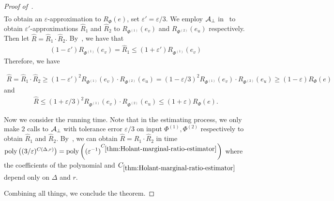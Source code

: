 \documentclass[11pt]{article}
\def\poly{\mathrm{poly}}
\newcommand{\wh}[1]{\widehat{#1}}
\renewcommand{\Pr}[2][]{ \ifthenelse{\isempty{#1}}
  {\mathbf{Pr}\left[#2\right]} {\mathbf{Pr}_{#1}\left[#2\right]} }
\begin{document}
\begin{proof}[Proof of~]
\begin{align*}
    \end{align*}
    To obtain an $\varepsilon$-approximation to $R_\Phi(e)$, set $\varepsilon' = \varepsilon/3$. We employ $\mathcal{A}_\bot$ in~ to obtain $\varepsilon'$-approximations $\wh{R}_1$ and $\wh{R}_2$ to $R_{\Phi^{(1)}}(e_v)$ and $R_{\Phi^{(2)}}(e_u)$ respectively. Then let $\wh{R} = \wh{R}_1 \cdot \wh{R}_2$. By~, we have that
    \begin{align*}
        (1 - \varepsilon')R_{\Phi^{(1)}}(e_v) = \wh{R}_1 \leq (1 + \varepsilon')R_{\Phi^{(1)}}(e_v)
    \end{align*}
    Therefore, we have

    
    \begin{align*}
        \wh{R} = \wh{R}_1 \cdot \wh{R}_2\ge (1 - \varepsilon')^2R_{\Phi^{(1)}}(e_v) \cdot R_{\Phi^{(2)}}(e_u) =
        (1 - \varepsilon/3)^2 R_{\Phi^{(1)}}(e_v) \cdot R_{\Phi^{(2)}}(e_u) \ge (1 - \varepsilon) R_{\Phi}(e)
    \end{align*}
    and
    \begin{align*}
        \wh{R} \le (1 + \varepsilon/3)^2 R_{\Phi^{(1)}}(e_v) \cdot R_{\Phi^{(2)}}(e_u) \le (1 + \varepsilon) R_{\Phi}(e).
    \end{align*}

    Now we consider the running time. Note that in the estimating process, we only make $2$ calls to $\mathcal{A}_\bot$ with tolerance error $\varepsilon/3$ on input $\Phi^{(1)}, \Phi^{(2)}$ respectively to obtain $\wh{R}_1$ and $\wh{R}_2$. By~, we can obtain $\wh{R} = \wh{R}_1 \cdot \wh{R}_2$ in time $\poly\left((3/\varepsilon)^{C(\Delta, r)}\right) = \poly\left((\varepsilon^{-1})^{C_{\ref{thm:Holant-marginal-ratio-estimator}}}\right)$ where the coefficients of the polynomial and $C_{\ref{thm:Holant-marginal-ratio-estimator}}$ depend only on $\Delta$ and $r$.

    Combining all things, we conclude the theorem.


\end{proof}
\end{document}
